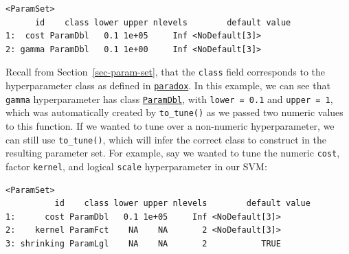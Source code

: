 \begin{verbatim}
<ParamSet>
      id    class lower upper nlevels        default value
1:  cost ParamDbl   0.1 1e+05     Inf <NoDefault[3]>      
2: gamma ParamDbl   0.1 1e+00     Inf <NoDefault[3]>      
\end{verbatim}

Recall from Section~\ref{sec-param-set}, that the \texttt{class} field
corresponds to the hyperparameter class as defined in
\href{https://paradox.mlr-org.com}{\texttt{paradox}}. In this example,
we can see that \texttt{gamma} hyperparameter has class
\href{https://paradox.mlr-org.com/reference/ParamDbl.html}{\texttt{ParamDbl}},
with \texttt{lower\ =\ 0.1} and \texttt{upper\ =\ 1}, which was
automatically created by \texttt{to\_tune()} as we passed two numeric
values to this function. If we wanted to tune over a non-numeric
hyperparameter, we can still use \texttt{to\_tune()}, which will infer
the correct class to construct in the resulting parameter set. For
example, say we wanted to tune the numeric \texttt{cost}, factor
\texttt{kernel}, and logical \texttt{scale} hyperparameter in our SVM:

\begin{Shaded}
\begin{Highlighting}[]
\OtherTok{=} \NormalTok{(}\NormalTok{,}
   \NormalTok{(}\NormalTok{, }\NormalTok{),}
   \NormalTok{(}\NormalTok{(}\NormalTok{, }\NormalTok{)),}
   \NormalTok{(),}
   
\NormalTok{)}

\SpecialCharTok{$}\SpecialCharTok{$}\NormalTok{()}
\end{Highlighting}
\end{Shaded}

\begin{verbatim}
<ParamSet>
          id    class lower upper nlevels        default value
1:      cost ParamDbl   0.1 1e+05     Inf <NoDefault[3]>      
2:    kernel ParamFct    NA    NA       2 <NoDefault[3]>      
3: shrinking ParamLgl    NA    NA       2           TRUE      
\end{verbatim}

